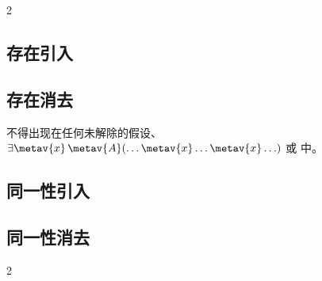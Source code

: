 \begin{multicols}{2}
\subsection*{存在引入}

\begin{fitchproof}
\end{fitchproof}

\vfill\null\columnbreak

\subsection*{存在消去}

\begin{fitchproof}
	\open
		\AS
	\close
\end{fitchproof}
\begin{raggedright}
\noindent {} 不得出现在任何未解除的假设、$\exists \metav{x}\,\metav{A}(\ldots \metav{x} \ldots \metav{x}\ldots)$ 或  中。\end{raggedright}
\end{multicols}

\subsection*{同一性引入}

\begin{fitchproof}
	 
\end{fitchproof}

\subsection*{同一性消去}

\begin{multicols}{2}
\begin{fitchproof}
	 
\end{fitchproof}
\begin{fitchproof}
	 
\end{fitchproof}
\end{multicols}

